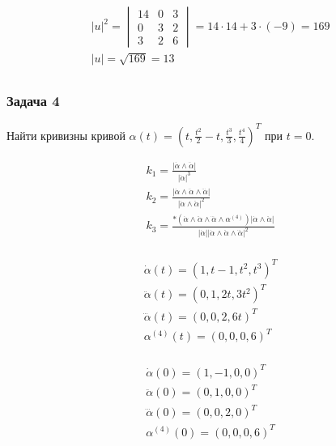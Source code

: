 $$\begin{gather}
|u|^{2} = \begin{vmatrix}
14 & 0 & 3 \\
0 & 3 & 2 \\
3 & 2 & 6
\end{vmatrix} = 14\cdot 14 + 3\cdot (-9) = 169 \\
|u| = \sqrt{ 169 } = 13 \\
\end{gather}$$

\subsubsection{Задача 4}

Найти кривизны кривой
\(\alpha(t) = \left( t, \frac{t^{2}}{2}-t, \frac{t^{3}}{3}, \frac{t^{4}}{4} \right)^{T}\)
при \(t = 0\).

$$\begin{gather}
k_{1} = \frac{|\dot{\alpha} \wedge \ddot{\alpha}|}{|\dot{\alpha}|^{3}} \\
k_{2} = \frac{|\dot{\alpha} \wedge \ddot{\alpha} \wedge \dddot{\alpha}|}{|\dot{\alpha} \wedge \ddot{\alpha}|^{2}} \\
k_{3} = \frac{*\left( \dot{\alpha} \wedge \ddot{\alpha} \wedge \dddot{\alpha} \wedge \alpha^{(4)} \right)|\dot{\alpha} \wedge \ddot{\alpha}|}{|\dot{\alpha}||\dot{\alpha}\wedge \ddot{\alpha } \wedge \dddot{\alpha}|^{2}} \\
\end{gather}$$

$$\begin{gather}
\dot{\alpha}(t) = (1, t-1, t^{2}, t^{3})^{T} \\
\ddot{\alpha}(t) = (0, 1, 2t, 3t^{2})^{T} \\
\dddot{\alpha}(t) = (0, 0, 2, 6t)^{T} \\
\alpha^{(4)}(t) = (0, 0, 0, 6)^{T} \\
\end{gather}$$

$$\begin{gather}
\dot{\alpha}(0) = (1, -1, 0, 0)^{T} \\
\ddot{\alpha}(0) = (0, 1, 0, 0)^{T} \\
\dddot{\alpha}(0) = (0, 0, 2, 0)^{T} \\
\alpha^{(4)}(0) = (0, 0, 0, 6)^{T} \\
\end{gather}$$


